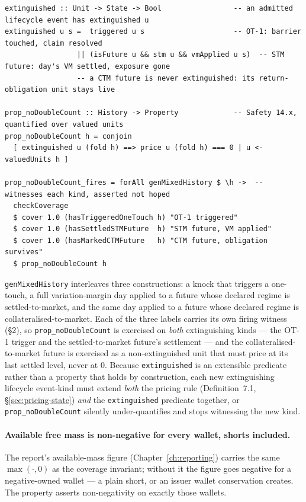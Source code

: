 \documentclass[11pt,a4paper]{article}
\begin{document}
\begin{lstlisting}
extinguished :: Unit -> State -> Bool                 -- an admitted lifecycle event has extinguished u
extinguished u s =  triggered u s                     -- OT-1: barrier touched, claim resolved
                 || (isFuture u && stm u && vmApplied u s)  -- STM future: day's VM settled, exposure gone
                 -- a CTM future is never extinguished: its return-obligation unit stays live

prop_noDoubleCount :: History -> Property             -- Safety 14.x, quantified over valued units
prop_noDoubleCount h = conjoin
  [ extinguished u (fold h) ==> price u (fold h) === 0 | u <- valuedUnits h ]

prop_noDoubleCount_fires = forAll genMixedHistory $ \h ->  -- witnesses each kind, asserted not hoped
  checkCoverage
  $ cover 1.0 (hasTriggeredOneTouch h) "OT-1 triggered"
  $ cover 1.0 (hasSettledSTMFuture  h) "STM future, VM applied"
  $ cover 1.0 (hasMarkedCTMFuture   h) "CTM future, obligation survives"
  $ prop_noDoubleCount h
\end{lstlisting}

\texttt{genMixedHistory} interleaves three constructions: a knock that triggers a one-touch, a
full variation-margin day applied to a future whose declared regime is settled-to-market, and
the same day applied to a future whose declared regime is collateralised-to-market. Each of the
three labels carries its own firing witness (\S 2), so
\texttt{prop\_noDoubleCount} is exercised on \emph{both} extinguishing kinds --- the OT-1 trigger
and the settled-to-market future's settlement --- and the collateralised-to-market future is
exercised as a non-extinguished unit that must price at its last settled level, never at $0$.
Because \texttt{extinguished} is an
extensible predicate rather than a property that holds by construction, each new extinguishing
lifecycle event-kind must extend \emph{both} the pricing rule (Definition~7.1,
\S\ref{sec:pricing-state}) \emph{and} the \texttt{extinguished} predicate together, or
\texttt{prop\_noDoubleCount} silently under-quantifies and stops witnessing the new kind.

\paragraph{Available free mass is non-negative for every wallet, shorts included.}
The report's available-mass figure (Chapter~\ref{ch:reporting}) carries the same
$\max(\cdot,0)$ as the coverage invariant; without it the figure goes negative for a
negative-owned wallet --- a plain short, or an issuer wallet conservation creates. The
property asserts non-negativity on exactly those wallets.
\end{document}

